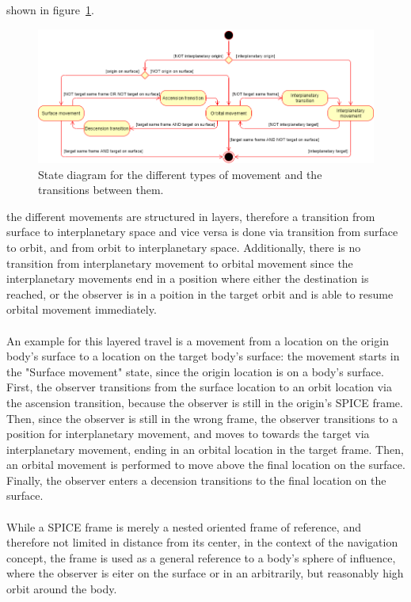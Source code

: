 shown in figure~\ref{fig:nav-states}.
\begin{figure}[h]
    \centering
    \includegraphics[width=\textwidth]{content/4_3_autoNavigation/img/NavigationStateDiagram}
    \caption{State diagram for the different types of movement and the transitions between them.}
    \label{fig:nav-states}
\end{figure}
the different movements are structured in layers, therefore a transition from surface to interplanetary space and
vice versa is done via transition from surface to orbit, and from orbit to interplanetary space.
Additionally, there is no transition from interplanetary movement to orbital movement since the interplanetary
movements end in a position where either the destination is reached, or the observer is in a poition in the target
orbit and is able to resume orbital movement immediately.
\\
\\
An example for this layered travel is a movement from a location on the origin body's surface to a location on the
target body's surface:
the movement starts in the "Surface movement" state, since the origin location is on a body's surface.
First, the observer transitions from the surface location to an orbit location via the ascension transition, because
the observer is still in the origin's SPICE frame.
Then, since the observer is still in the wrong frame, the observer transitions to a position for interplanetary
movement, and moves to towards the target via interplanetary movement, ending in an orbital location in the target
frame.
Then, an orbital movement is performed to move above the final location on the surface.
Finally, the observer enters a decension transitions to the final location on the surface.
\\
\\
While a SPICE frame is merely a nested oriented frame of reference, and therefore not limited in distance from its
center, in the context of the navigation concept, the frame is used as a general reference to a body's sphere of
influence, where the observer is eiter on the surface or in an arbitrarily, but reasonably high orbit around the body.

